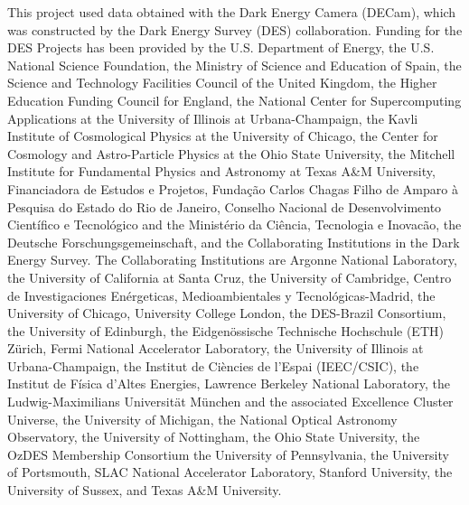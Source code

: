 This project used data obtained with the Dark Energy Camera (DECam),
which was constructed by the Dark Energy Survey (DES) collaboration.
Funding for the DES Projects has been provided by 
the U.S. Department of Energy, 
the U.S. National Science Foundation, 
the Ministry of Science and Education of Spain, 
the Science and Technology Facilities Council of the United Kingdom, 
the Higher Education Funding Council for England, 
the National Center for Supercomputing Applications at the University of Illinois at Urbana-Champaign, 
the Kavli Institute of Cosmological Physics at the University of Chicago, 
the Center for Cosmology and Astro-Particle Physics at the Ohio State University, 
the Mitchell Institute for Fundamental Physics and Astronomy at Texas A\&M University, 
Financiadora de Estudos e Projetos, Funda{\c c}{\~a}o Carlos Chagas Filho de Amparo {\`a} Pesquisa do Estado do Rio de Janeiro, 
Conselho Nacional de Desenvolvimento Cient{\'i}fico e Tecnol{\'o}gico and the Minist{\'e}rio da Ci{\^e}ncia, Tecnologia e Inovac{\~a}o, 
the Deutsche Forschungsgemeinschaft, 
and the Collaborating Institutions in the Dark Energy Survey.
The Collaborating Institutions are 
Argonne National Laboratory, 
the University of California at Santa Cruz, 
the University of Cambridge, 
Centro de Investigaciones En{\'e}rgeticas, Medioambientales y Tecnol{\'o}gicas-Madrid, 
the University of Chicago, 
University College London, 
the DES-Brazil Consortium, 
the University of Edinburgh, 
the Eidgen{\"o}ssische Technische Hoch\-schule (ETH) Z{\"u}rich, 
Fermi National Accelerator Laboratory, 
the University of Illinois at Urbana-Champaign, 
the Institut de Ci{\`e}ncies de l'Espai (IEEC/CSIC), 
the Institut de F{\'i}sica d'Altes Energies, 
Lawrence Berkeley National Laboratory, 
the Ludwig-Maximilians Universit{\"a}t M{\"u}nchen and the associated Excellence Cluster Universe, 
the University of Michigan, 
{the} National Optical Astronomy Observatory, 
the University of Nottingham, 
the Ohio State University, 
the OzDES Membership Consortium
the University of Pennsylvania, 
the University of Portsmouth, 
SLAC National Accelerator Laboratory, 
Stanford University, 
the University of Sussex, 
and Texas A\&M University.


